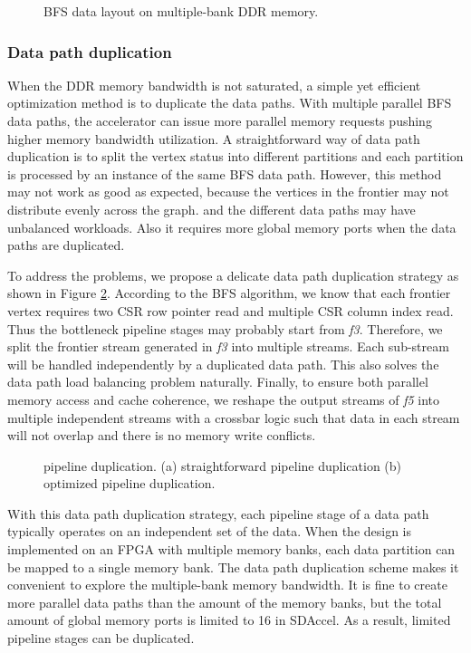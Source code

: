 \begin{figure}
	\caption{BFS data layout on multiple-bank DDR memory.}
	\label{fig:csr-layout}
	\vspace{-1em}
\end{figure}


\subsubsection{Data path duplication}
When the DDR memory bandwidth is not saturated, a simple 
yet efficient optimization method is to duplicate the data paths. 
With multiple parallel BFS data paths, the accelerator can issue more parallel 
memory requests pushing higher memory bandwidth utilization. A straightforward 
way of data path duplication is to split the vertex status into different 
partitions and each partition is processed by an instance of the same BFS data path.
However, this method may not work as good as expected, because 
the vertices in the frontier may not distribute evenly across the graph. 
and the different data paths may have unbalanced workloads. Also it requires 
more global memory ports when the data paths are duplicated.

To address the problems, we propose a delicate data path duplication strategy 
as shown in Figure \ref{fig:duplicate-pipeline}. According to the BFS algorithm, 
we know that each frontier vertex requires two CSR row pointer read and multiple 
CSR column index read. Thus the bottleneck pipeline stages may probably start 
from \textit{f3}. Therefore, we split the frontier stream generated in \textit{f3} into 
multiple streams. Each sub-stream will be handled independently by a 
duplicated data path. This also solves the data path load balancing problem 
naturally. Finally, to ensure both parallel memory access and cache coherence,  
we reshape the output streams of \textit{f5} into multiple independent streams 
with a crossbar logic such that data in each stream will not overlap 
and there is no memory write conflicts. 

\begin{figure}
	\caption{pipeline duplication. (a) straightforward pipeline duplication 
	(b) optimized pipeline duplication.}
	\label{fig:duplicate-pipeline}
	\vspace{-1.5em}
\end{figure}

With this data path duplication strategy, each pipeline stage of a data path typically 
operates on an independent set of the data. When the design is implemented on 
an FPGA with multiple memory banks, each data partition can be mapped to a single memory bank.
The data path duplication scheme makes it convenient to explore the multiple-bank 
memory bandwidth. It is fine to create more parallel data paths than the amount of the memory 
banks, but the total amount of global memory ports is limited to 16 in SDAccel. As a result, 
limited pipeline stages can be duplicated. 

